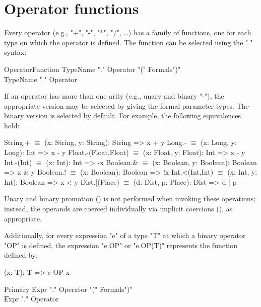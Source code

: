 \section{Operator functions}

Every operator (e.g.,
\xcd"+",
\xcd"-",
\xcd"*",
\xcd"/",
\dots) has a family of functions, one for
each type on which the operator is defined. The function can be
selected using the "." syntax:

\begin{grammar}
OperatorFunction
        \: TypeName \xcd"." Operator \xcd"(" Formals\opt \xcd")" \\
        \| TypeName \xcd"." Operator \\
\end{grammar}

If an operator has more than one arity (e.g., unary and binary
\xcd"-"), the appropriate version may be selected by giving the
formal parameter types.  The binary version is selected by
default.
For example, the following equivalences hold:

\begin{xtenmath}
String.+             $\equiv$ (x: String, y: String): String => x + y
Long.-               $\equiv$ (x: Long, y: Long): Int => x - y
Float.-(Float,Float) $\equiv$ (x: Float, y: Float): Int => x - y
Int.-(Int)           $\equiv$ (x: Int): Int => -x
Boolean.&            $\equiv$ (x: Boolean, y: Boolean): Boolean => x & y
Boolean.!            $\equiv$ (x: Boolean): Boolean => !x
Int.<(Int,Int)       $\equiv$ (x: Int, y: Int): Boolean => x < y
Dist.|(Place)        $\equiv$ (d: Dist, p: Place): Dist => d | p
\end{xtenmath}

Unary and binary promotion () is not performed
when invoking these
operations; instead, the operands are coerced individually via implicit
coercions (), as appropriate.

Additionally, for every expression \xcd"e" of a type \xcd"T" at which a binary
operator \xcd"OP" is defined, the expression \xcd"e.OP" or
\xcd"e.OP(T)" represents the function
defined by:

\begin{xten}
(x: T): T => { e OP x }
\end{xten}

\begin{grammar}
Primary \: Expr \xcd"." Operator \xcd"(" Formals\opt \xcd")" \\
        \| Expr \xcd"." Operator \\
\end{grammar}

